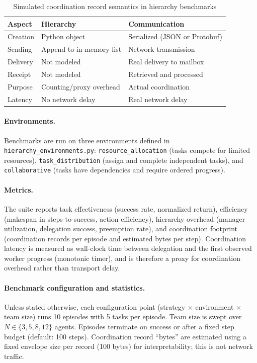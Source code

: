 \begin{table}[H]
\centering
\caption{Simulated coordination record semantics in hierarchy benchmarks}
\label{tab:msg-semantics}
\begin{tabular}{l|l|l}
\toprule
\textbf{Aspect} & \textbf{Hierarchy} & \textbf{Communication} \\
\midrule
Creation  & Python object            & Serialized (JSON or Protobuf) \\
Sending   & Append to in-memory list & Network transmission          \\
Delivery  & Not modeled              & Real delivery to mailbox      \\
Receipt   & Not modeled              & Retrieved and processed       \\
Purpose   & Counting/proxy overhead  & Actual coordination           \\
Latency   & No network delay         & Real network delay            \\
\bottomrule
\end{tabular}
\end{table}

\paragraph{Environments.}
Benchmarks are run on three environments defined in \texttt{hierarchy\_environments.py}: \texttt{resource\_allocation} (tasks compete for limited resources), \texttt{task\_distribution} (assign and complete independent tasks), and \texttt{collaborative} (tasks have dependencies and require ordered progress).

\paragraph{Metrics.}
The suite reports task effectiveness (success rate, normalized return), efficiency (makespan in steps-to-success, action efficiency), hierarchy overhead (manager utilization, delegation success, preemption rate), and coordination footprint (coordination records per episode and estimated bytes per step). Coordination latency is measured as wall-clock time between delegation and the first observed worker progress (monotonic timer), and is therefore a proxy for coordination overhead rather than transport delay.

\paragraph{Benchmark configuration and statistics.}
Unless stated otherwise, each configuration point (strategy $\times$ environment $\times$ team size) runs 10 episodes with 5 tasks per episode. Team size is swept over $N \in \{3,5,8,12\}$ agents. Episodes terminate on success or after a fixed step budget (default: 100 steps). Coordination record ``bytes'' are estimated using a fixed envelope size per record (100 bytes) for interpretability; this is not network traffic.

